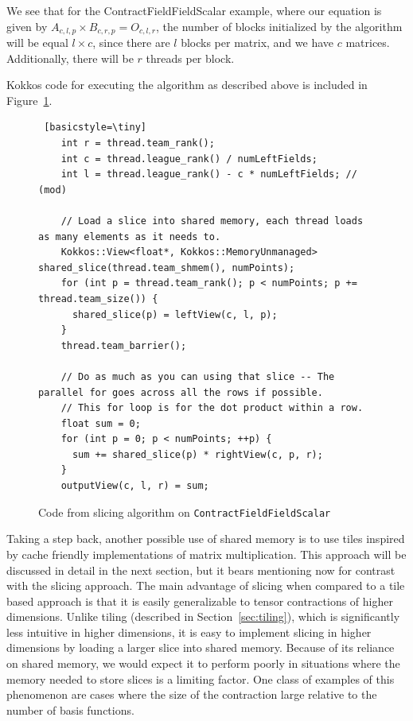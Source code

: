 We see that for the ContractFieldFieldScalar example, where our equation is given by
$A_{c,l,p} \times B_{c, r, p} = O_{c,l, r}$, the
number of blocks initialized by the algorithm will be equal $l \times c$,
since there are $l$ blocks per matrix, and we have $c$ matrices.
Additionally, there will be $r$ threads per block. 


    Kokkos code for executing the algorithm as described above is included in Figure~\ref{lst:ContractFieldFieldScalarSlice}. 

\begin{figure}[ht]
    \begin{lstlisting} [basicstyle=\tiny]
    int r = thread.team_rank();
    int c = thread.league_rank() / numLeftFields;
    int l = thread.league_rank() - c * numLeftFields; // (mod)

    // Load a slice into shared memory, each thread loads as many elements as it needs to.
    Kokkos::View<float*, Kokkos::MemoryUnmanaged> shared_slice(thread.team_shmem(), numPoints);
    for (int p = thread.team_rank(); p < numPoints; p += thread.team_size()) {
      shared_slice(p) = leftView(c, l, p);
    }
    thread.team_barrier();

    // Do as much as you can using that slice -- The parallel for goes across all the rows if possible.
    // This for loop is for the dot product within a row.
    float sum = 0;
    for (int p = 0; p < numPoints; ++p) {
      sum += shared_slice(p) * rightView(c, p, r);
    }
    outputView(c, l, r) = sum;

   \end{lstlisting}
\caption{Code from slicing algorithm on \texttt{ContractFieldFieldScalar}
\label{lst:ContractFieldFieldScalarSlice}} 
\end{figure}

    Taking a step back, another possible use of shared memory is to use tiles inspired
    by cache friendly implementations of matrix multiplication. This approach will be discussed
    in detail in the next section, but it bears mentioning now for contrast with the slicing approach. 
    The main advantage of slicing when compared to a tile based approach is that it is easily generalizable to
tensor contractions of higher dimensions. Unlike tiling (described in Section~\ref{sec:tiling}), which is significantly
less intuitive in higher dimensions, it is easy to implement slicing in higher
dimensions by loading a larger slice into shared memory. Because of its
reliance on shared memory, we would expect it to perform poorly in situations where the memory
needed to store slices is a limiting factor. One class of examples of this phenomenon are cases where the size of the contraction large relative to the number of basis functions. 

